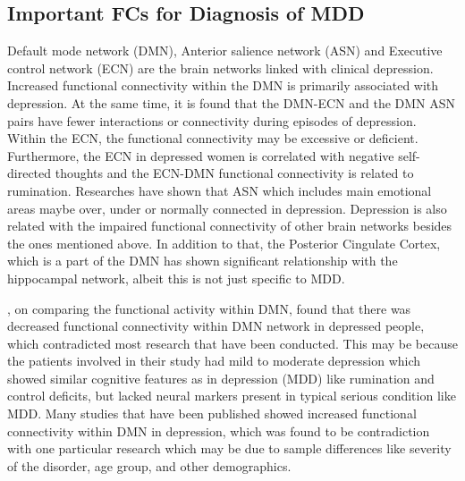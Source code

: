 ﻿\documentclass[12pt]{article}
\begin{document}
\subsection{Important FCs for Diagnosis of MDD}

Default mode network (DMN), Anterior salience network (ASN) and
Executive control network (ECN) are the brain networks linked with
clinical depression. Increased functional connectivity within the DMN
is primarily associated with depression. At the same time, it is found
that the DMN-ECN and the DMN ASN pairs have fewer interactions or
connectivity during episodes of depression. Within the ECN, the
functional connectivity may be excessive or deficient. Furthermore,
the ECN in depressed women is correlated with negative self-directed
thoughts and the ECN-DMN functional connectivity is related to
rumination. Researches have shown that ASN which includes main
emotional areas maybe over, under or normally connected in
depression. Depression is also related with the impaired functional
connectivity of other brain networks besides the ones mentioned
above. In addition to that, the Posterior Cingulate Cortex, which is
a part of the DMN has shown significant relationship with the
hippocampal network, albeit this is not just specific to MDD.

\textcite{LRbrainnetwork}, on comparing the functional activity within
DMN, found that there was decreased functional connectivity within DMN
network in depressed people, which contradicted most research that
have been conducted. This may be because the patients involved in
their study had mild to moderate depression which showed similar
cognitive features as in depression (MDD) like rumination and control
deficits, but lacked neural markers present in typical serious
condition like MDD. Many studies that have been published showed
increased functional connectivity within DMN in depression, which was
found to be contradiction with one particular research which may be
due to sample differences like severity of the disorder, age group,
and other demographics.
\end{document}
